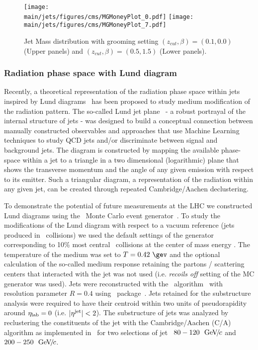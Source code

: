 %
\begin{figure}[!h]
\begin{center}
\texttt{[image: \\main/jets/figures/cms/MGMoneyPlot\_0.pdf]}
\texttt{[image: \\main/jets/figures/cms/MGMoneyPlot\_7.pdf]}
\caption{Jet Mass distribution with grooming setting $(z_{cut},\beta)=(0.1,0.0)$ (Upper panels) and $(z_{cut},\beta)=(0.5,1.5)$ (Lower panels).~\cite{CMS-FTR-17-002:2017dec}}
\label{fig:Mass}
\end{center}
\end{figure}

\clearpage
\newpage
\subsubsection{Radiation phase space with Lund diagram}

Recently, a theoretical representation of the radiation phase space within jets inspired by Lund diagrams~\cite{Andersson:1988gp} has been proposed to study medium modification of the radiation pattern. The so-called Lund jet plane~\cite{Dreyer:2018nbf} - a robust portrayal of the internal structure of jets - was designed to build a conceptual connection between manually constructed observables and approaches that use Machine Learning techniques to study QCD jets and/or discriminate between signal and background jets.
The diagram is constructed by mapping the available phase-space within a jet to a triangle in a two dimensional (logarithmic) plane that shows the transverse momentum and the angle of any given emission with respect to its emitter.
Such a triangular diagram, a representation of the radiation within any given jet, can be created through repeated Cambridge/Aachen declustering.

To demonstrate the potential of future measurements at the LHC we constructed Lund diagrams using the \jewel\ Monte Carlo event generator~\cite{Zapp:2013vla}.
To study the modifications of the Lund diagram with respect to a vacuum reference (jets produced in \pp\ collisions) we used the default settings of the generator corresponding to 10\% most central \PbPb\ collisions at the center of mass energy .
The temperature of the medium was set to $T=0.42~\gev$ and the optional calculation of the so-called medium response retaining the partons / scattering centers that interacted with the jet was not used (i.e. {\it recoils off} setting of the MC generator was used).
Jets were reconstructed with the \akt\ algorithm~\cite{Cacciari:2008gp} with resolution parameter $R=0.4$ using \fastjet\ package~\cite{Cacciari:2011ma,Cacciari:2005hq}.
Jets retained for the substructure analysis were required to have their centroid within two units of pseudorapidity around $\eta_{\rm lab}=0$ (i.e. $|\eta^{\rm jet}| < 2$).
The substructure of jets was analyzed by reclustering the constituents of the jet with the Cambridge/Aachen (C/A) algorithm as implemented in \fastjet\ for two selections of jet \pt\ $80-120~~\text{GeV}\!/\mspace{-2mu}c$ and $200-250~~\text{GeV}\!/\mspace{-2mu}c$.

